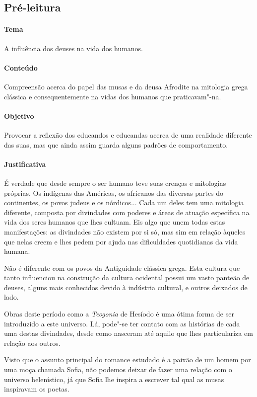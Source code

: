 \documentclass[12pt]{extarticle}
\begin{document}
\subsection{Pré-leitura} 

\paragraph{Tema} A influência dos deuses na vida dos humanos.

\paragraph{Conteúdo} Compreensão acerca do papel das musas e da deusa Afrodite
na mitologia grega clássica e consequentemente na vidas dos humanos que praticavam"-na.

\paragraph{Objetivo} Provocar a reflexão dos educandos e educandas acerca de
uma realidade diferente das suas, mas que ainda assim guarda alguns padrões 
de comportamento. 

\paragraph{Justificativa} É verdade que desde sempre o ser humano teve suas
crenças e mitologias próprias. Os indígenas das Américas, os africanos das diversas
partes do continentes, os povos judeus e os nórdicos... Cada um deles tem uma
mitologia diferente, composta por divindades com poderes e áreas de atuação
específica na vida dos seres humanos que lhes cultuam. Eis algo que unem todas
estas manifestações: as divindades não existem por si só, mas sim em relação 
àqueles que nelas creem e lhes pedem por ajuda nas dificuldades quotidianas da vida
humana. 

Não é diferente com os povos da Antiguidade clássica grega. Esta cultura que tanto
influenciou na construção da cultura ocidental possui um vasto panteão
de deuses, alguns mais conhecidos devido à indústria cultural, e outros
deixados de lado.

Obras deste período como a \textit{Teogonia} de Hesíodo é uma ótima forma de
ser introduzido a este universo. Lá, pode"-se ter contato com as histórias
de cada uma destas divindades, desde como nasceram até aquilo que lhes
particulariza em relação aos outros. 

Visto que o assunto principal do romance estudado é a paixão de um homem por
uma moça chamada Sofia, não podemos deixar de fazer uma relação com o universo 
helenístico, já que Sofia lhe inspira a escrever tal qual as musas inspiravam os
poetas.
\end{document}
